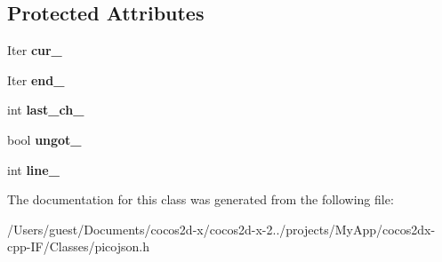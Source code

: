 \subsection*{Protected Attributes}
\begin{DoxyCompactItemize}
\item 
\hypertarget{classpicojson_1_1input_afb97b3422a91d0f3388527a5999c8174}{Iter {\bfseries cur\-\_\-}}\label{classpicojson_1_1input_afb97b3422a91d0f3388527a5999c8174}

\item 
\hypertarget{classpicojson_1_1input_acb4fd4c90d1b0db37bc32ccae16361ab}{Iter {\bfseries end\-\_\-}}\label{classpicojson_1_1input_acb4fd4c90d1b0db37bc32ccae16361ab}

\item 
\hypertarget{classpicojson_1_1input_a198f74377fcf1128e496b5dc06a1aad0}{int {\bfseries last\-\_\-ch\-\_\-}}\label{classpicojson_1_1input_a198f74377fcf1128e496b5dc06a1aad0}

\item 
\hypertarget{classpicojson_1_1input_a01956f4acf46afe7f1d84ea493cb41da}{bool {\bfseries ungot\-\_\-}}\label{classpicojson_1_1input_a01956f4acf46afe7f1d84ea493cb41da}

\item 
\hypertarget{classpicojson_1_1input_a7bbb41c7f78ffc19d3219e38c2858b74}{int {\bfseries line\-\_\-}}\label{classpicojson_1_1input_a7bbb41c7f78ffc19d3219e38c2858b74}

\end{DoxyCompactItemize}


The documentation for this class was generated from the following file\-:\begin{DoxyCompactItemize}
\item 
/\-Users/guest/\-Documents/cocos2d-\/x/cocos2d-\/x-\/2../projects/\-My\-App/cocos2dx-\/cpp-\/\-I\-F/\-Classes/picojson.\-h\end{DoxyCompactItemize}
